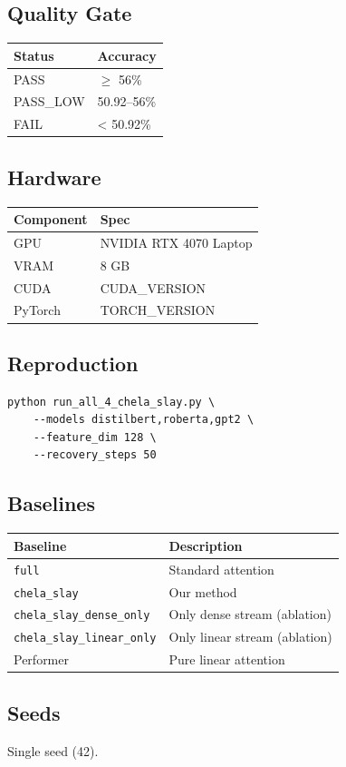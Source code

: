 \subsection{Quality Gate}

\begin{table}[H]
\centering
\small
\begin{tabular}{ll}
\toprule
\textbf{Status} & \textbf{Accuracy} \\
\midrule
PASS & $\ge$ 56\% \\
PASS\_LOW & 50.92--56\% \\
FAIL & < 50.92\% \\
\bottomrule
\end{tabular}
\end{table}

\subsection{Hardware}

\begin{table}[H]
\centering
\small
\begin{tabular}{ll}
\toprule
\textbf{Component} & \textbf{Spec} \\
\midrule
GPU & NVIDIA RTX 4070 Laptop \\
VRAM & 8 GB \\
CUDA & {{CUDA\_VERSION}} \\
PyTorch & {{TORCH\_VERSION}} \\
\bottomrule
\end{tabular}
\end{table}

\subsection{Reproduction}

\begin{lstlisting}
python run_all_4_chela_slay.py \
    --models distilbert,roberta,gpt2 \
    --feature_dim 128 \
    --recovery_steps 50
\end{lstlisting}

\subsection{Baselines}

\begin{table}[H]
\centering
\small
\begin{tabular}{ll}
\toprule
\textbf{Baseline} & \textbf{Description} \\
\midrule
\texttt{full} & Standard attention \\
\texttt{chela\_slay} & Our method \\
\texttt{chela\_slay\_dense\_only} & Only dense stream (ablation) \\
\texttt{chela\_slay\_linear\_only} & Only linear stream (ablation) \\
Performer & Pure linear attention \\
\bottomrule
\end{tabular}
\end{table}

\subsection{Seeds}

Single seed (42).


